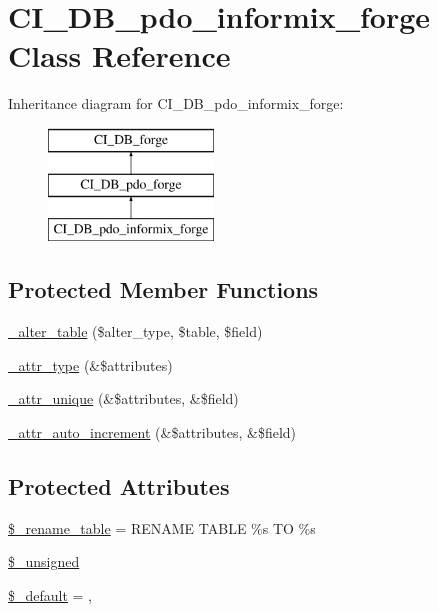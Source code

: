 \hypertarget{class_c_i___d_b__pdo__informix__forge}{}\section{C\+I\+\_\+\+D\+B\+\_\+pdo\+\_\+informix\+\_\+forge Class Reference}
\label{class_c_i___d_b__pdo__informix__forge}
Inheritance diagram for C\+I\+\_\+\+D\+B\+\_\+pdo\+\_\+informix\+\_\+forge\+:\begin{figure}[H]
\begin{center}
\leavevmode
\includegraphics[height=3.000000cm]{class_c_i___d_b__pdo__informix__forge}
\end{center}
\end{figure}
\subsection*{Protected Member Functions}
\begin{DoxyCompactItemize}
\item 
\mbox{\hyperlink{class_c_i___d_b__pdo__informix__forge_a41c6cae02f2fda8b429ad0afb9509426}{\+\_\+alter\+\_\+table}} (\$alter\+\_\+type, \$table, \$field)
\item 
\mbox{\hyperlink{class_c_i___d_b__pdo__informix__forge_a8553be952084c6f7cdfff370a1d14f6b}{\+\_\+attr\+\_\+type}} (\&\$attributes)
\item 
\mbox{\hyperlink{class_c_i___d_b__pdo__informix__forge_a7568a93ea53a7392a63fffe83bb7a090}{\+\_\+attr\+\_\+unique}} (\&\$attributes, \&\$field)
\item 
\mbox{\hyperlink{class_c_i___d_b__pdo__informix__forge_a2a013a5932439c3c44f0dad3436525f7}{\+\_\+attr\+\_\+auto\+\_\+increment}} (\&\$attributes, \&\$field)
\end{DoxyCompactItemize}
\subsection*{Protected Attributes}
\begin{DoxyCompactItemize}
\item 
\mbox{\hyperlink{class_c_i___d_b__pdo__informix__forge_a1a649e7cf9de16bcf932977b18bc91de}{\$\+\_\+rename\+\_\+table}} = \textquotesingle{}R\+E\+N\+A\+ME T\+A\+B\+LE \%s TO \%s\textquotesingle{}
\item 
\mbox{\hyperlink{class_c_i___d_b__pdo__informix__forge_aae977ae6d61fa183f0b25422b6ddc31c}{\$\+\_\+unsigned}}
\item 
\mbox{\hyperlink{class_c_i___d_b__pdo__informix__forge_aa119e1b4e3d00f47a7b83b7066087915}{\$\+\_\+default}} = \textquotesingle{}, \textquotesingle{}
\end{DoxyCompactItemize}
